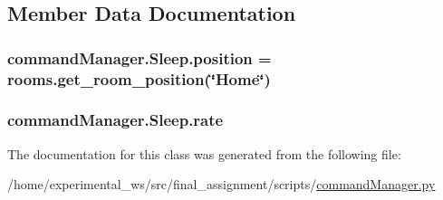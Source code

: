 \subsection{Member Data Documentation}
\subsubsection[{\texorpdfstring{position}{position}}]{\setlength{\rightskip}{0pt plus 5cm}command\+Manager.\+Sleep.\+position = rooms.\+get\+\_\+room\+\_\+position(\char`\"{}Home\char`\"{})\hspace{0.3cm}{\ttfamily [static]}}\hypertarget{classcommandManager_1_1Sleep_ab64714b4c7c4b5a8824986a8e7af976e}{}\label{classcommandManager_1_1Sleep_ab64714b4c7c4b5a8824986a8e7af976e}
\subsubsection[{\texorpdfstring{rate}{rate}}]{\setlength{\rightskip}{0pt plus 5cm}command\+Manager.\+Sleep.\+rate}\hypertarget{classcommandManager_1_1Sleep_ad1bca2bd2c57109d92089b82fafe23c1}{}\label{classcommandManager_1_1Sleep_ad1bca2bd2c57109d92089b82fafe23c1}


The documentation for this class was generated from the following file\+:\begin{DoxyCompactItemize}
\item 
/home/experimental\+\_\+ws/src/final\+\_\+assignment/scripts/\hyperlink{commandManager_8py}{command\+Manager.\+py}\end{DoxyCompactItemize}
